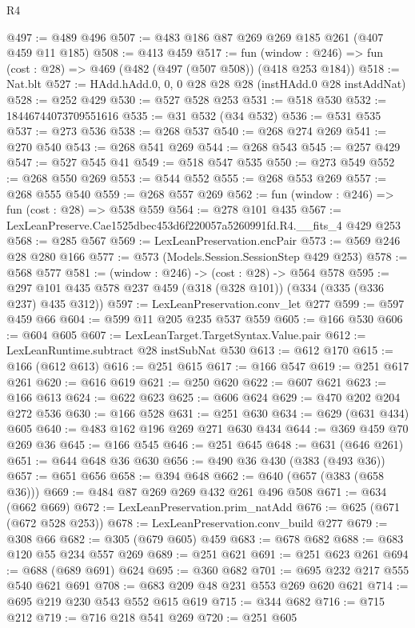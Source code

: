 \begin{lexlean}{R4}
\begin{coremodule}
@497 := @489 @496
@507 := @483 @186 @87 @269 @269 @185 @261 (@407 @459 @11 @185)
@508 := @413 @459
@517 := fun (window : @246) => fun (cost : @28) => @469 (@482 (@497 (@507 @508)) (@418 @253 @184))
@518 := Nat.blt
@527 := HAdd.hAdd.{0, 0, 0} @28 @28 @28 (instHAdd.{0} @28 instAddNat)
@528 := @252 @429
@530 := @527 @528 @253
@531 := @518 @530
@532 := 18446744073709551616
@535 := @31 @532 (@34 @532)
@536 := @531 @535
@537 := @273 @536
@538 := @268 @537
@540 := @268 @274 @269
@541 := @270 @540
@543 := @268 @541 @269
@544 := @268 @543
@545 := @257 @429
@547 := @527 @545 @41
@549 := @518 @547 @535
@550 := @273 @549
@552 := @268 @550 @269
@553 := @544 @552
@555 := @268 @553 @269
@557 := @268 @555 @540
@559 := @268 @557 @269
@562 := fun (window : @246) => fun (cost : @28) => @538 @559
@564 := @278 @101 @435
@567 := LexLeanPreserve.Cae1525dbec453d6f220057a5260991fd.R4.__fits_4 @429 @253
@568 := @285 @567
@569 := LexLeanPreservation.encPair
@573 := @569 @246 @28 @280 @166
@577 := @573 (Models.Session.SessionStep @429 @253)
@578 := @568 @577
@581 := (window : @246) -> (cost : @28) -> @564 @578
@595 := @297 @101 @435 @578 @237 @459 (@318 (@328 @101)) (@334 (@335 (@336 @237) @435 @312))
@597 := LexLeanPreservation.conv_let @277
@599 := @597 @459 @66
@604 := @599 @11 @205 @235 @537 @559
@605 := @166 @530
@606 := @604 @605
@607 := LexLeanTarget.TargetSyntax.Value.pair
@612 := LexLeanRuntime.subtract @28 instSubNat @530
@613 := @612 @170
@615 := @166 (@612 @613)
@616 := @251 @615
@617 := @166 @547
@619 := @251 @617 @261
@620 := @616 @619
@621 := @250 @620
@622 := @607 @621
@623 := @166 @613
@624 := @622 @623
@625 := @606 @624
@629 := @470 @202 @204 @272 @536
@630 := @166 @528
@631 := @251 @630
@634 := @629 (@631 @434) @605
@640 := @483 @162 @196 @269 @271 @630 @434
@644 := @369 @459 @70 @269 @36
@645 := @166 @545
@646 := @251 @645
@648 := @631 (@646 @261)
@651 := @644 @648 @36 @630
@656 := @490 @36 @430 (@383 (@493 @36))
@657 := @651 @656
@658 := @394 @648
@662 := @640 (@657 (@383 (@658 @36)))
@669 := @484 @87 @269 @269 @432 @261 @496 @508
@671 := @634 (@662 @669)
@672 := LexLeanPreservation.prim_natAdd
@676 := @625 (@671 (@672 @528 @253))
@678 := LexLeanPreservation.conv_build @277
@679 := @308 @66
@682 := @305 (@679 @605) @459
@683 := @678 @682
@688 := @683 @120 @55 @234 @557 @269
@689 := @251 @621
@691 := @251 @623 @261
@694 := @688 (@689 @691) @624
@695 := @360 @682
@701 := @695 @232 @217 @555 @540 @621 @691
@708 := @683 @209 @48 @231 @553 @269 @620 @621
@714 := @695 @219 @230 @543 @552 @615 @619
@715 := @344 @682
@716 := @715 @212
@719 := @716 @218 @541 @269
@720 := @251 @605

\end{coremodule}
\end{lexlean}
